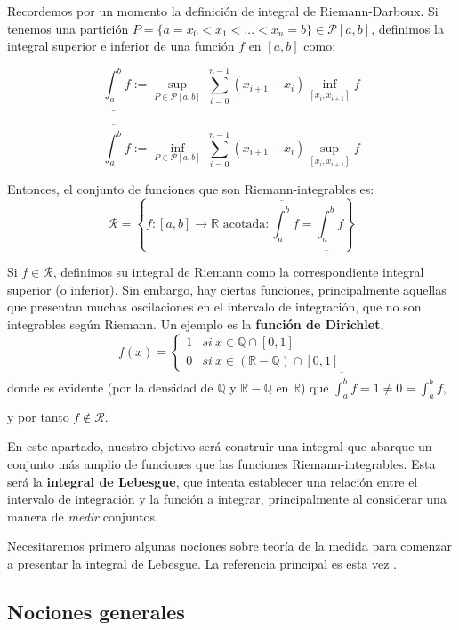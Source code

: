 Recordemos por un momento la definición de integral de Riemann-Darboux. Si tenemos una partición $P = \{ a = x_0 < x_1 < \dots < x_n = b\} \in \mathcal P [a,b]$, definimos la integral superior e inferior de una función $f$ en $[a,b]$ como: 

 $$\underline{\int_a^b} f := \sup_{P \in \mathcal P [a,b]} \ \sum_{i=0}^{n-1} (x_{i+1} - x_i) \inf_{[x_i, x_{i+1}]} f$$

$$\overline {\int_a^b} f := \inf_{P \in \mathcal P [a,b]} \ \sum_{i=0}^{n-1} (x_{i+1} - x_i) \sup_{[x_i, x_{i+1}]} f$$

Entonces, el conjunto de funciones que son Riemann-integrables es: $$\mathcal R = \left\{ f:[a,b] \to \mathbb{R} \text{ acotada} : \overline {\int_a^b} f = \underline {\int_a^b} f\right\}$$

Si $f \in \mathcal R$, definimos su integral de Riemann como la correspondiente integral superior (o inferior). Sin embargo, hay ciertas funciones, principalmente aquellas que presentan muchas oscilaciones en el intervalo de integración, que no son integrables según Riemann. Un ejemplo es la \textbf{función de Dirichlet}, $$f(x) = \begin{cases} 1 & si \ x \in \mathbb Q \cap [0,1]\\ 0 & si \ x \in (\mathbb{R} - \mathbb Q) \cap [0,1] \end{cases}$$ donde es evidente (por la densidad de $\mathbb Q$ y $\mathbb{R} - \mathbb Q$ en $\mathbb{R}$) que $\displaystyle \overline {\int_a^b} f = 1 \ne 0 = \underline {\int_a^b} f$, y por tanto $f \notin \mathcal R$.

En este apartado, nuestro objetivo será construir una integral que abarque un conjunto más amplio de funciones que las funciones Riemann-integrables. Esta será la \textbf{integral de Lebesgue}, que intenta establecer una relación entre el intervalo de integración y la función a integrar, principalmente al considerar una manera de \textit{medir} conjuntos.

Necesitaremos primero algunas nociones sobre teoría de la medida para comenzar a presentar la integral de Lebesgue. La referencia principal es esta vez \cite[Capítulo 1]{rudin}.



\subsection{Nociones generales}

